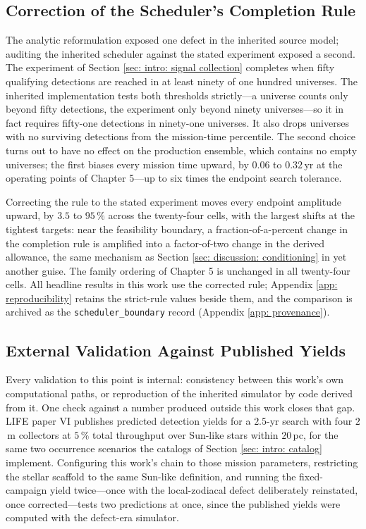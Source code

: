 \documentclass[12pt,a4paper]{article}
\numberwithin{equation}{section}
\numberwithin{figure}{section}
\numberwithin{table}{section}
\begin{document}
\FloatBarrier
\subsection{Correction of the Scheduler's Completion Rule} \label{sec: tse: scheduler}
The analytic reformulation exposed one defect in the inherited source model; auditing the inherited scheduler against the stated experiment exposed a second. The experiment of Section \ref{sec: intro: signal collection} completes when fifty qualifying detections are reached in at least ninety of one hundred universes. The inherited implementation tests both thresholds strictly---a universe counts only beyond fifty detections, the experiment only beyond ninety universes---so it in fact requires fifty-one detections in ninety-one universes. It also drops universes with no surviving detections from the mission-time percentile. The second choice turns out to have no effect on the production ensemble, which contains no empty universes; the first biases every mission time upward, by $0.06$ to $0.32$\,yr at the operating points of Chapter 5---up to six times the endpoint search tolerance.

Correcting the rule to the stated experiment moves every endpoint amplitude upward, by $3.5$ to $95\,\%$ across the twenty-four cells, with the largest shifts at the tightest targets: near the feasibility boundary, a fraction-of-a-percent change in the completion rule is amplified into a factor-of-two change in the derived allowance, the same mechanism as Section \ref{sec: discussion: conditioning} in yet another guise. The family ordering of Chapter 5 is unchanged in all twenty-four cells. All headline results in this work use the corrected rule; Appendix \ref{app: reproducibility} retains the strict-rule values beside them, and the comparison is archived as the \texttt{scheduler\_boundary} record (Appendix \ref{app: provenance}).

\subsection{External Validation Against Published Yields} \label{sec: ts reduction: evalidation}
Every validation to this point is internal: consistency between this work's own computational paths, or reproduction of the inherited simulator by code derived from it. One check against a number produced outside this work closes that gap. LIFE paper VI \cite{kammerer2022life6} publishes predicted detection yields for a $2.5$-yr search with four $2$\,m collectors at $5\,\%$ total throughput over Sun-like stars within $20$\,pc, for the same two occurrence scenarios the catalogs of Section \ref{sec: intro: catalog} implement. Configuring this work's chain to those mission parameters, restricting the stellar scaffold to the same Sun-like definition, and running the fixed-campaign yield twice---once with the local-zodiacal defect deliberately reinstated, once corrected---tests two predictions at once, since the published yields were computed with the defect-era simulator.
\end{document}
